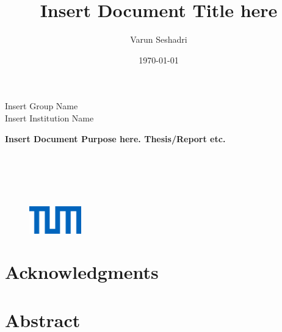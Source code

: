 
\title{Insert Document Title here}
\author{Varun Seshadri}
\date{\today}


\begin{titlepage}
    \begin{minipage}[b]{0.4\linewidth}
        {\color{blue} \scriptsize Insert Group Name \\Insert Institution Name}
    \end{minipage}
    \hfill
     \begin{minipage}[b]{0.3\linewidth}       
        {
        }
      \end{minipage}
    
    \begin{center}
        \vspace{25mm}
        \begin{Large}
            \textbf{Insert Document Purpose here. Thesis/Report etc.\\}
        \end{Large}
        \begin{Huge}
            \vspace{10mm}
            \textbf{\thetitle\\}
        \end{Huge}
        \vspace{10mm}
        \begin{large}
            \theauthor \\
            \vspace{5mm}
            \thedate\\
        \end{large}
        
        \vfill
        \begin{figure}[h]
            \centering
        \end{figure}
        \begin{figure}[h]
            \centering
            \includegraphics[width=0.2\textwidth]{images/TUM.png}
        \end{figure}
        
    \end{center}
\end{titlepage}

\newpage
\section*{Acknowledgments}
    \lipsum[1]


\newpage
\section*{Abstract}
    \lipsum[2]
